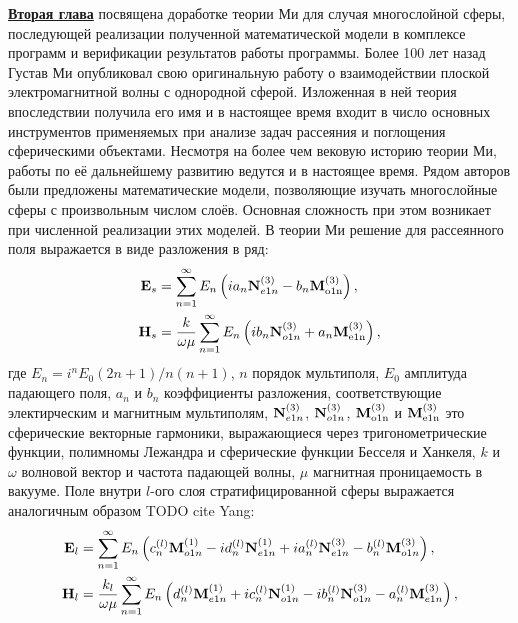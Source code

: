 \underline{\textbf{Вторая глава}} посвящена доработке теории Ми для
случая многослойной сферы, последующей реализации полученной
математической модели в комплексе программ и верификации результатов
работы программы. Более 100 лет назад Густав Ми опубликовал свою
оригинальную работу о взаимодействии плоской электромагнитной волны с
однородной сферой.  Изложенная в ней теория впоследствии получила его
имя и в настоящее время входит в число основных инструментов
применяемых при анализе задач рассеяния и поглощения сферическими
объектами.  Несмотря на более чем вековую историю теории Ми, работы по
её дальнейшему развитию ведутся и в настоящее время.  Рядом авторов
были предложены математические модели, позволяющие изучать
многослойные сферы с произвольным числом слоёв.  Основная сложность
при этом возникает при численной реализации этих моделей.  В теории Ми
решение для рассеянного поля выражается в виде разложения в ряд:
\begin{align*}
{\rm \mathbf{E}}_s &=\sum_{n=1}^{\infty} E_n \left( i a_n {\rm
    \mathbf{N}}_{e1n}^{(3)} - b_n{\rm\mathbf{M}_{o1n}^{(3)}} \right),\\
{\rm \mathbf{H}}_s &=\frac{k}{\omega\mu}
 \sum_{n=1}^{\infty} E_n \left( i b_n {\rm
    \mathbf{N}}_{o1n}^{(3)} + a_n{\rm\mathbf{M}_{e1n}^{(3)}} \right),  
\end{align*}
где $E_n=i^nE_0(2n+1)/n(n+1)$, $n$ порядок мультиполя, $E_0$ амплитуда
падающего поля, $a_n$ и $b_n$ коэффициенты разложения, соответствующие
электирческим и магнитным мультиполям, ${\rm \mathbf{N}}_{e1n}^{(3)}$,
${\rm \mathbf{N}}_{o1n}^{(3)}$, ${\rm\mathbf{M}_{o1n}^{(3)}}$ и
${\rm\mathbf{M}_{e1n}^{(3)}}$ это сферические векторные гармоники,
выражающиеся через тригонометрические функции, полимномы Лежандра и
сферические функции Бесселя и Ханкеля, $k$ и $\omega$ волновой вектор
и частота падающей волны, $\mu$ магнитная проницаемость в вакууме.
Поле внутри $l$-ого слоя стратифицированной сферы выражается
аналогичным образом TODO cite Yang:
\begin{align*}
{\rm \mathbf{E}}_l &=\sum_{n=1}^{\infty} E_n \left(
                     c_n^{(l)}{\rm\mathbf{M}}_{o1n}^{(1)}
                     -i d_n^{(l)} {\rm \mathbf{N}}_{e1n}^{(1)}
                     +i a_n^{(l)} {\rm \mathbf{N}}_{e1n}^{(3)}
                     - b_n^{(l)}{\rm\mathbf{M}}_{o1n}^{(3)} 
                     \right),\\
{\rm \mathbf{H}}_l &=\frac{k_l}{\omega\mu} \sum_{n=1}^{\infty} E_n
                     \left(
                      d_n^{(l)}{\rm\mathbf{M}}_{e1n}^{(1)} 
                     +i c_n^{(l)} {\rm \mathbf{N}}_{o1n}^{(1)} 
                     -i b_n^{(l)} {\rm \mathbf{N}}_{o1n}^{(3)} 
                     - a_n^{(l)}{\rm\mathbf{M}}_{e1n}^{(3)} 
                     \right),  
\end{align*}
